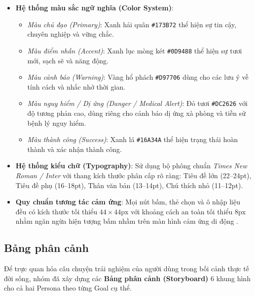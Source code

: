 \begin{itemize}
    \item \textbf{Hệ thống màu sắc ngữ nghĩa (Color System)}:
    \begin{itemize}
        \item \textit{Màu chủ đạo (Primary)}: Xanh hải quân \texttt{\#173B72} thể hiện sự tin cậy, chuyên nghiệp và vững chắc.
        \item \textit{Màu điểm nhấn (Accent)}: Xanh lục mòng két \texttt{\#0D9488} thể hiện sự tươi mới, sạch sẽ và năng động.
        \item \textit{Màu cảnh báo (Warning)}: Vàng hổ phách \texttt{\#D97706} dùng cho các lưu ý về tính cách và nhắc nhở thời gian.
        \item \textit{Màu nguy hiểm / Dị ứng (Danger / Medical Alert)}: Đỏ tươi \texttt{\#DC2626} với độ tương phản cao, dùng riêng cho cảnh báo dị ứng xà phòng và tiền sử bệnh lý nguy hiểm.
        \item \textit{Màu thành công (Success)}: Xanh lá \texttt{\#16A34A} thể hiện trạng thái hoàn thành và xác nhận thành công.
    \end{itemize}
    \item \textbf{Hệ thống kiểu chữ (Typography)}: Sử dụng bộ phông chuẩn \textit{Times New Roman / Inter} với thang kích thước phân cấp rõ ràng: Tiêu đề lớn (22--24pt), Tiêu đề phụ (16--18pt), Thân văn bản (13--14pt), Chú thích nhỏ (11--12pt).
    \item \textbf{Quy chuẩn tương tác cảm ứng}: Mọi nút bấm, thẻ chọn và ô nhập liệu đều có kích thước tối thiểu $44 \times 44\text{px}$ với khoảng cách an toàn tối thiểu $8\text{px}$ nhằm ngăn ngừa hiện tượng bấm nhầm trên màn hình cảm ứng di động \cite{norman2013design}.
\end{itemize}

\subsection{Bảng phân cảnh}
Để trực quan hóa câu chuyện trải nghiệm của người dùng trong bối cảnh thực tế đời sống, nhóm đã xây dựng các \textbf{Bảng phân cảnh (Storyboard)} 6 khung hình cho cả hai Persona theo từng Goal cụ thể.

